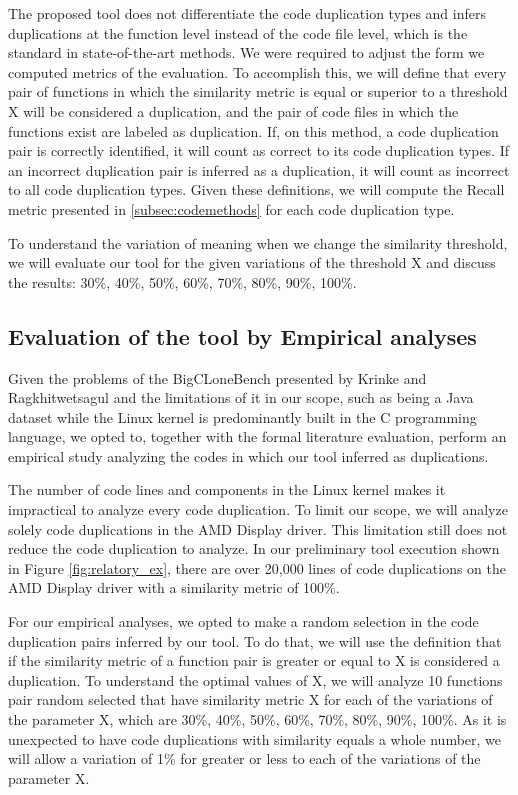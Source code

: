 The proposed tool does not differentiate the code duplication types and infers duplications 
at the function level instead of the code file level, which is the standard in state-of-the-art 
methods. We were required to adjust the form we computed metrics of the evaluation. To accomplish 
this, we will define that every pair of functions in which the similarity metric is equal or 
superior to a threshold X will be considered a duplication, and the pair of code files in which 
the functions exist are labeled as duplication. If, on this method, a code duplication pair is 
correctly identified, it will count as correct to its code duplication types. If an incorrect 
duplication pair is inferred as a duplication, it will count as incorrect to all code duplication 
types. Given these definitions, we will compute the Recall metric presented in \ref{subsec:codemethods}
for each code duplication type.

To understand the variation of meaning when we change the similarity threshold, we will evaluate 
our tool for the given variations of the threshold X and discuss the results: 
30\%, 40\%, 50\%, 60\%, 70\%, 80\%, 90\%, 100\%.

\subsection{Evaluation of the tool by Empirical analyses}

Given the problems of the BigCLoneBench presented by Krinke and Ragkhitwetsagul \citep{bigfail}
and the limitations of it in our scope, such as being a Java dataset while the Linux kernel 
is predominantly built in the C programming language, we opted to, together with the formal 
literature evaluation, perform an empirical study analyzing the codes in which our tool inferred 
as duplications.

The number of code lines and components in the Linux kernel makes it impractical to analyze every 
code duplication. To limit our scope, we will analyze solely code duplications in the AMD Display 
driver. This limitation still does not reduce the code duplication to analyze. In our preliminary 
tool execution shown in Figure \ref{fig:relatory_ex}, there are over 20,000 lines of code 
duplications on the AMD Display driver with a similarity metric of 100\%.

For our empirical analyses, we opted to make a random selection in the code duplication pairs 
inferred by our tool. To do that, we will use the definition that if the similarity metric of a 
function pair is greater or equal to X is considered a duplication. To understand the optimal 
values of X, we will analyze 10 functions pair random selected that have similarity metric X 
for each of the variations of the parameter X, which are 
30\%, 40\%, 50\%, 60\%, 70\%, 80\%, 90\%, 100\%. 
As it is unexpected to have code duplications with similarity equals a whole number, we will 
allow a variation of 1\% for greater or less to each of the variations of the parameter X.

